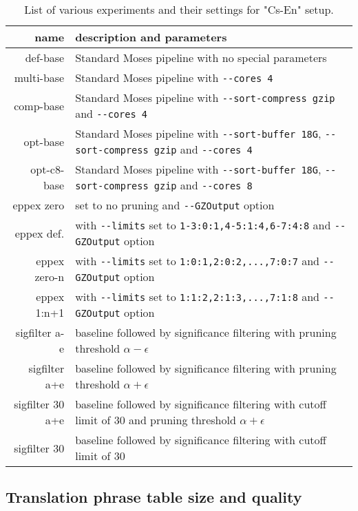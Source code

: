 \begin{table}[ht]
\centering
\begin{tabular}{ r p{10cm} }
name & description and parameters \\
\hline
\hline
def-base        & Standard Moses pipeline with no special parameters \\
multi-base      & Standard Moses pipeline with \verb|--cores 4| \\
comp-base       & Standard Moses pipeline with \verb|--sort-compress gzip| and \verb|--cores 4| \\
opt-base        & Standard Moses pipeline with \verb|--sort-buffer 18G|, \verb|--sort-compress gzip| and \verb|--cores 4| \\
opt-c8-base     & Standard Moses pipeline with \verb|--sort-buffer 18G|, \verb|--sort-compress gzip| and \verb|--cores 8| \\
\hline
eppex zero      & \eppex{} set to no pruning and \verb|--GZOutput| option \\
eppex def.      & \eppex{} with \verb|--limits| set to \verb|1-3:0:1,4-5:1:4,6-7:4:8| and \verb|--GZOutput| option \\
eppex zero-n    & \eppex{} with \verb|--limits| set to \verb|1:0:1,2:0:2,...,7:0:7| and \verb|--GZOutput| option \\
eppex 1:n+1     & \eppex{} with \verb|--limits| set to \verb|1:1:2,2:1:3,...,7:1:8| and \verb|--GZOutput| option \\
\hline
sigfilter a-e   & baseline followed by significance filtering with pruning threshold $\alpha - \epsilon$ \\
sigfilter a+e   & baseline followed by significance filtering with pruning threshold $\alpha + \epsilon$ \\
sigfilter 30 a+e  & baseline followed by significance filtering with cutoff limit of 30 and pruning threshold $\alpha + \epsilon$ \\
sigfilter 30    & baseline followed by significance filtering with cutoff limit of 30 \\
\hline
\hline
\end{tabular}
\caption{\label{cs-en-wmt13-scenarios}
List of various experiments and their settings for "Cs-En" setup.}
\end{table}

\subsection{Translation phrase table size and quality}

